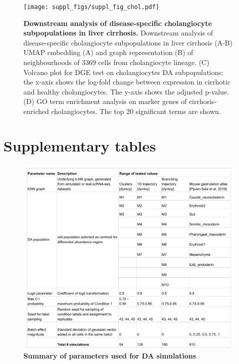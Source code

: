 \documentclass[
]{article}
\begin{document}
\begin{figure}
\centering
\texttt{[image: suppl\_figs/suppl\_fig\_chol.pdf]}
\caption{\label{fig:sup-fig-liver-chol}\textbf{Downstream analysis of disease-specific cholangiocyte subpopulations in liver cirrhosis.}
Downstream analysis of disease-specific cholangiocyte subpopulations in liver cirrhosis
(A-B) UMAP embedding (A) and graph representation (B) of neighbourhoods of 3369 cells from cholangiocyte lineage.
(C) Volcano plot for DGE test on cholangiocytes DA subpopulations: the x-axis shows the log-fold change between expression in cirrhotic and healthy cholangiocytes. The y-axis shows the adjusted p-value.
(D) GO term enrichment analysis on marker genes of cirrhosis-enriched cholangiocytes. The top 20 significant terms are shown.}
\end{figure}







\newpage

\hypertarget{supplementary-tables}{%
\section*{Supplementary tables}\label{supplementary-tables}}

\renewcommand{\figurename}{Supplementary Table}
\setcounter{figure}{0}

\begin{figure}
\centering
\includegraphics{suppl_tables/table_simulation_params.pdf}
\caption{\label{fig:sup-tab-2}\textbf{Summary of parameters used for DA simulations}}
\end{figure}
\end{document}
